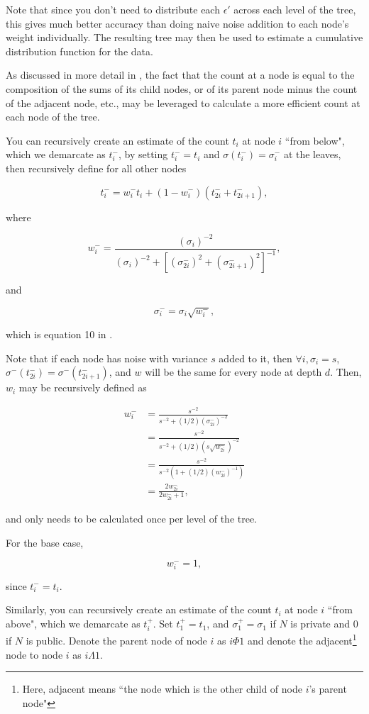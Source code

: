 \documentclass[11pt, oneside]{article}
\newcommand{\eps}{\epsilon}
\begin{document}
Note that since you don't need to distribute each $\eps'$ across each level of the tree, this gives much better accuracy than doing naive noise addition to each node's weight individually. The resulting tree may then be used to estimate a cumulative distribution function for the data. 

As discussed in more detail in \cite{honacker}, the fact that the count at a node is equal to the composition of the sums of its child nodes, or of its parent node minus the count of the adjacent node, etc., may be leveraged to calculate a more efficient count at each node of the tree.

You can recursively create an estimate of the count $t_i$ at node $i$ ``from below", which we demarcate as $t_i^-$, by setting $t_i^- = t_i$ and $\sigma(t_i^-)=\sigma^-_i$ at the leaves, then recursively define for all other nodes 

$$ t_i^- = w_i^- t_i + (1-w_i^-)(t_{2i}^- + t_{2i+1}^-), $$

where

$$ w_i^- = \frac{(\sigma_i)^{-2}}{(\sigma_i)^{-2} + \left[ (\sigma_{2i}^-)^2 + (\sigma_{2i+1}^-)^2\right]^{-1}},$$

and 

$$ \sigma_i^- = \sigma_i \sqrt{w_i^-},$$

which is equation 10 in \cite{honacker}.

Note that if each node has noise with variance $s$ added to it, then $\forall i, \sigma_i=s$, $\sigma^-(t_{2i}^-) = \sigma^-(t_{2i+1}^-)$, and $w$ will be the same for every node at depth $d$. Then, $w_i$ may be recursively defined as 

\begin{align*}
w_i^- &= \frac{s^{-2}}{s^{-2} + (1/2)(\sigma_{2i}^-)^{-2}}\\
	&= \frac{s^{-2}}{s^{-2} + (1/2)\left(s\sqrt{w_{2i}^-}\right)^{-2}}\\
	&= \frac{s^{-2}}{s^{-2}(1+(1/2)(w_{2i}^-)^{-1})}\\
	&= \frac{2w_{2i}^-}{2w_{2i}^- + 1},
\end{align*}

and only needs to be calculated once per level of the tree.

For the base case, 

$$ w_i^- = 1,$$

since $t_i^- = t_i.$

Similarly, you can recursively create an estimate of the count $t_i$ at node $i$ ``from above", which we demarcate as $t_i^+$. Set $t_1^+ = t_1$, and $\sigma_1^+ = \sigma_1$ if $N$ is private and 0 if $N$ is public. Denote the parent node of node $i$ as $i \Phi 1$ and denote the adjacent\footnote{Here, adjacent means ``the node which is the other child of node $i$'s parent node"} node to node $i$ as $i\Lambda1$. 
\end{document}
